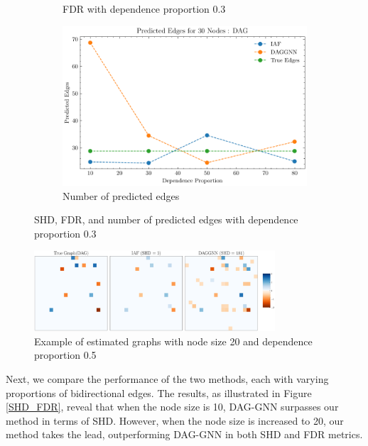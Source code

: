 \documentclass[10pt]{article}
\begin{document}
\begin{figure}
\begin{subfigure}{0.45\textwidth}
        \caption{FDR with dependence proportion 0.3}
        \label{FDR_prop30}
    \end{subfigure}
    \begin{subfigure}{0.45\textwidth}
        \includegraphics[width=\textwidth]{fig/Predicted Edges_dependence_30_DAG_threshold0.3.pdf}
        \caption{Number of predicted edges}
        \label{pred_edge_prop30}
    \end{subfigure}
    \caption{SHD, FDR, and number of predicted edges with dependence proportion 0.3}
    \label{SHD_FDR_prop30}
\end{figure}

\begin{figure}[H]
    \centering
    \includegraphics[width=0.8\textwidth]{fig/comparison_dep_20_50_seed31.pdf}
    \caption{Example of estimated graphs with node size 20 and dependence proportion 0.5}
    \label{example_graphs}
\end{figure}

Next, we compare the performance of the two methods, each with varying proportions of bidirectional edges. The results, as illustrated in Figure \ref*{SHD_FDR}, reveal that when the node size is 10, DAG-GNN surpasses our method in terms of SHD. However, when the node size is increased to 20, our method takes the lead, outperforming DAG-GNN in both SHD and FDR metrics.
\end{document}
